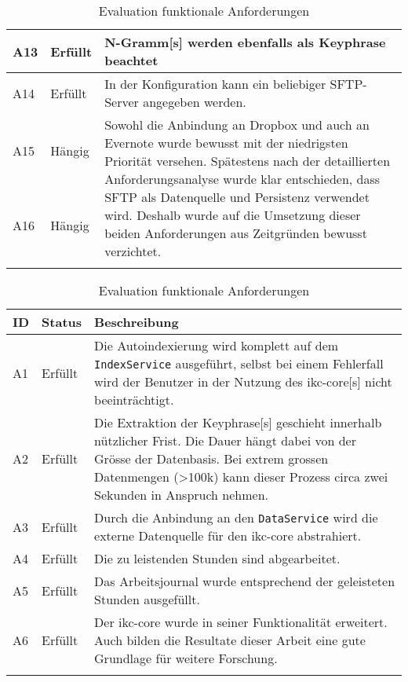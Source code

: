 \begin{longtable}{|p{1.5cm} | p{1.5cm} | p{8.1cm}|}
    A13 & Erfüllt & \gls{N-Gramm}[s] werden ebenfalls als \gls{Keyphrase} beachtet\\\hline
    A14 & Erfüllt & In der Konfiguration kann ein beliebiger \gls{SFTP}-Server angegeben werden.  \\\hline
    \newpage
    \hline
    A15 & Hängig & \multirow{2}{8.1cm}{Sowohl die Anbindung an Dropbox und auch an Evernote wurde bewusst mit der niedrigsten Priorität versehen. Spätestens nach der detaillierten Anforderungsanalyse wurde klar entschieden, dass \gls{SFTP} als Datenquelle und Persistenz verwendet wird. Deshalb wurde auf die Umsetzung dieser beiden Anforderungen aus Zeitgründen bewusst verzichtet.}\\\cline{1-2}
    A16 & Hängig & \\[4cm]\hline
    \caption{Evaluation funktionale Anforderungen}
  \label{tab:funktionale-anforderungen-eval}
\end{longtable}


\begin{longtable}{|p{1.5cm} | p{1.5cm} | p{8.1cm}|}
  \hline
    ID & Status & Beschreibung \\\hline
    A1 & Erfüllt & Die Autoindexierung wird komplett auf dem \texttt{IndexService} ausgeführt, selbst bei einem Fehlerfall wird der Benutzer in der Nutzung des \gls{ikc-core}[s] nicht beeinträchtigt.\\\hline
    A2 & Erfüllt & Die Extraktion der \gls{Keyphrase}[s] geschieht innerhalb nützlicher Frist. Die Dauer hängt dabei von der Grösse der Datenbasis. Bei extrem grossen Datenmengen (>100k) kann dieser Prozess circa zwei Sekunden in Anspruch nehmen.\\\hline
    A3 & Erfüllt & Durch die Anbindung an den \texttt{DataService} wird die externe Datenquelle für den \gls{ikc-core} abstrahiert.\\\hline
    A4 & Erfüllt & Die zu leistenden Stunden sind abgearbeitet.\\\hline
    A5 & Erfüllt & Das Arbeitsjournal wurde entsprechend der geleisteten Stunden ausgefüllt.\\\hline
    A6 & Erfüllt & Der \gls{ikc-core} wurde in seiner Funktionalität erweitert. Auch bilden die Resultate dieser Arbeit eine gute Grundlage für weitere Forschung.\\\hline
    \caption{Evaluation funktionale Anforderungen}
  \label{tab:nicht-funktionale-anforderungen-eval}
\end{longtable}

